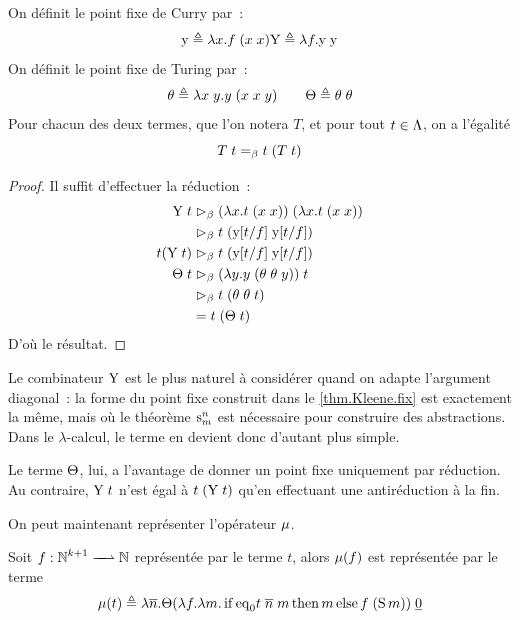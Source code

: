 \begin{definition}
  On définit le point fixe de Curry par~:
  \[\mathrm{y} \triangleq \lambda x.f\;(x\;x)
  \mathrm{Y} \triangleq \lambda f.\mathrm{y}\;\mathrm{y}\]
  On définit le point fixe de Turing par~:
  \[\theta \triangleq \lambda x\;y.y\;(x\;x\;y) \qquad
  \Theta \triangleq \theta\;\theta\]
  Pour chacun des deux termes, que l'on notera $T$, et pour tout
  $t \in \Lambda$, on a l'égalité
  \[T\;t =_{\beta} t\;(T\;t)\]
  \index[notation]{$\LtY$}
  \index[notation]{$\LtT$}
\end{definition}

\begin{proof}
  Il suffit d'effectuer la réduction~:
  \begin{align*}
    \mathrm{Y}\;t &\mathrel{\rhd_{\beta}} (\lambda x.t\;(x\;x))\;(\lambda x.t\;(x\;x))\\
    &\mathrel{\rhd_{\beta}} t\;(\mathrm{y}[t/f]\;\mathrm{y}[t/f]) \\
    t(\mathrm{Y}\;t) &\mathrel{\rhd_{\beta}} t\;(\mathrm{y}[t/f]\;\mathrm{y}[t/f])\\
    \Theta\;t &\mathrel{\rhd_{\beta}} (\lambda y.y\;(\theta\;\theta\;y))\;t \\
    &\mathrel{\rhd_{\beta}} t\;(\theta\;\theta\;t) \\
    &= t\;(\Theta\;t)
  \end{align*}
  D'où le résultat.
\end{proof}

Le combinateur $\LtY$ est le plus naturel à considérer quand on adapte
l'argument diagonal~: la forme du point fixe construit dans le
\cref{thm.Kleene.fix} est exactement la même, mais où le théorème $\mathrm{s}_{m}^{n}$
est nécessaire pour construire des abstractions. Dans le $\lambda$-calcul,
le terme en devient donc d'autant plus simple.

Le terme $\LtT$, lui, a l'avantage de donner un point fixe uniquement par
réduction. Au contraire, $\mathrm{Y}\;t$ n'est égal à $t\;(\mathrm{Y}\;t)$ qu'en effectuant
une antiréduction à la fin.

On peut maintenant représenter l'opérateur $\mathbin{\mu}$.

\begin{proposition}
  Soit $\makeFunNamePartial{f}{\bN^{k+1}}{\bN}$ représentée par le terme
  $t$, alors $\mathbin{\mu}(f)$ est représentée par le terme
  \[\mathbin{\mu}(t) \triangleq \lambda
  \overline{n}.\Theta(\lambda f.\lambda m.\operatorname{if} \mathrm{eq}_0 t\;\overline{n}\;m
  \operatorname{then} m \operatorname{else} f\;(\operatorname{S} m))\;\underline{0}\]
\end{proposition}

